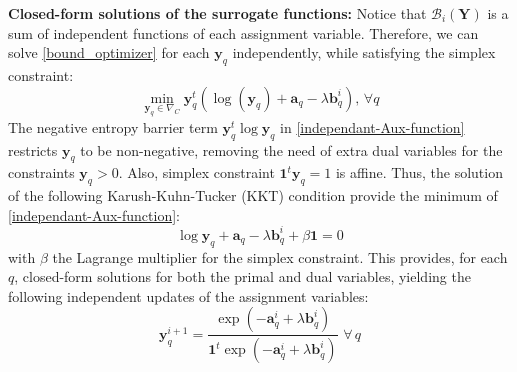 \documentclass{article}
\newcommand{\yy}{{\mathbf y}}
\newcommand{\Bcal}{\mathcal{B}}
\newcommand{\YY}{\mathbf Y}
\newcommand{\one}{{\mathbf 1}}
\begin{document}
{\bf Closed-form solutions of the surrogate functions:} Notice that $\Bcal_i(\YY)$ is a sum of independent functions of each assignment variable. Therefore, we can 
solve \eqref{bound_optimizer} for each $\yy_q$ independently, while satisfying the simplex constraint:
\begin{equation}
\label{independant-Aux-function}
\min_{\yy_q \in \nabla_C} \yy_q^t (\log (\yy_q) + {\mathbf a}_q - \lambda{\mathbf b}_q^i), \, \forall q
\end{equation} 
The negative entropy barrier term $\yy_q^t \log \yy_q$ in \eqref{independant-Aux-function} restricts $\yy_q$ to be non-negative, removing the need of extra dual variables for the constraints $\yy_q>0$. Also, simplex constraint $\one^t\yy_q=1$ is affine. Thus, the solution of the following Karush-Kuhn-Tucker (KKT) condition provide the minimum of \eqref{independant-Aux-function}:
\begin{equation}
\label{KKT}
\log \yy_q + {\mathbf a}_q - \lambda{\mathbf b}_q^i + \beta \one = 0
\end{equation}
with $\beta$ the Lagrange multiplier for the simplex constraint. This provides, for each $q$, closed-form solutions for both the primal and dual variables, yielding the following independent updates of the assignment variables: 
\begin{equation}
\label{closed-form}
\yy_{q}^{i+1} = \frac{\exp ( - {\mathbf a}_q^i+ \lambda{\mathbf b}_q^i) }{{\mathbf 1}^t \exp (-{\mathbf a}_q^i+ \lambda{\mathbf b}_q^i)} \, \, \forall \, q 
\end{equation}
\end{document}
